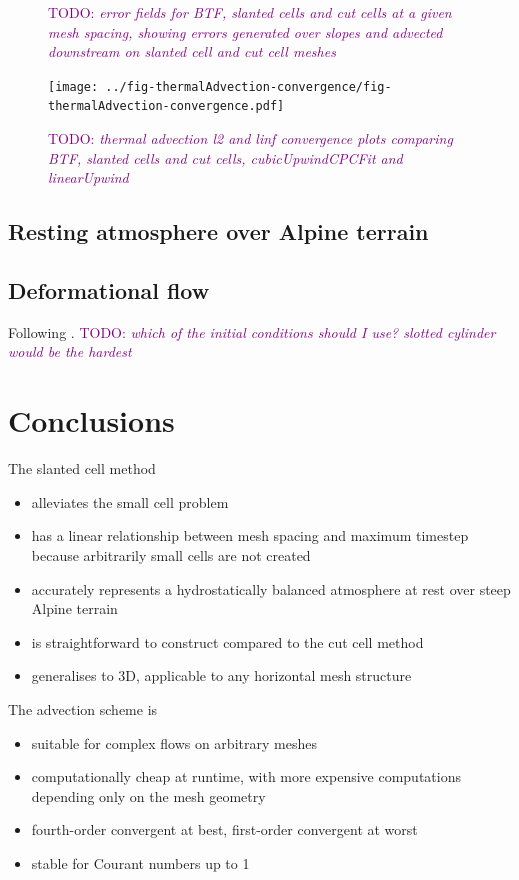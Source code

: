 \documentclass{article}
\newcommand{\TODO}[1]{\textcolor{purple}{TODO: \emph{#1}}}
\begin{document}
\begin{figure}
	\caption{\TODO{error fields for BTF, slanted cells and cut cells at a given mesh spacing, showing errors generated over slopes and advected downstream on slanted cell and cut cell meshes}}
\end{figure}

\begin{figure}
	\texttt{[image: ../fig-thermalAdvection-convergence/fig-thermalAdvection-convergence.pdf]}
	\caption{\TODO{thermal advection l2 and linf convergence plots comparing BTF, slanted cells and cut cells, cubicUpwindCPCFit and linearUpwind}}
\end{figure}

\subsection{Resting atmosphere over Alpine terrain}

\subsection{Deformational flow}
Following \citep{lauritzen2012}.  \TODO{which of the initial conditions should I use?  slotted cylinder would be the hardest}

\section{Conclusions}

The slanted cell method
\begin{itemize}
	\item alleviates the small cell problem
	\item has a linear relationship between mesh spacing and maximum timestep because arbitrarily small cells are not created
	\item accurately represents a hydrostatically balanced atmosphere at rest over steep Alpine terrain
	\item is straightforward to construct compared to the cut cell method
	\item generalises to 3D, applicable to any horizontal mesh structure
\end{itemize}

The advection scheme is
\begin{itemize}
	\item suitable for complex flows on arbitrary meshes
	\item computationally cheap at runtime, with more expensive computations depending only on the mesh geometry
	\item fourth-order convergent at best, first-order convergent at worst
	\item stable for Courant numbers up to 1
\end{itemize}
\end{document}
